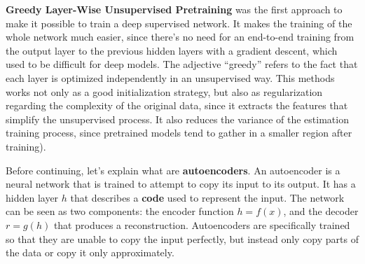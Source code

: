 \textbf{Greedy Layer-Wise Unsupervised Pretraining} was the first approach to make it possible to train a deep supervised network. It makes the training of the whole network much easier, since there's no need for an end-to-end training from the output layer to the previous hidden layers with a gradient descent, which used to be difficult for deep models. The adjective ``greedy'' refers to the fact that each layer is optimized independently in an unsupervised way. This methods works not only as a good initialization strategy, but also as regularization regarding the complexity of the original data, since it extracts the features that simplify the unsupervised process. It also reduces the variance of the estimation training process, since pretrained models tend to gather in a smaller region after training).

Before continuing, let's explain what are \textbf{autoencoders}. An autoencoder is a neural network that is trained to attempt to copy its input to its output. It has a hidden layer $h$ that describes a \textbf{code} used to represent the input. The network can be seen as two components: the encoder function $h = f(x)$, and the decoder $r = g(h)$ that produces a reconstruction. Autoencoders are specifically trained so that they are unable to copy the input perfectly, but instead only copy parts of the data or copy it only approximately.
